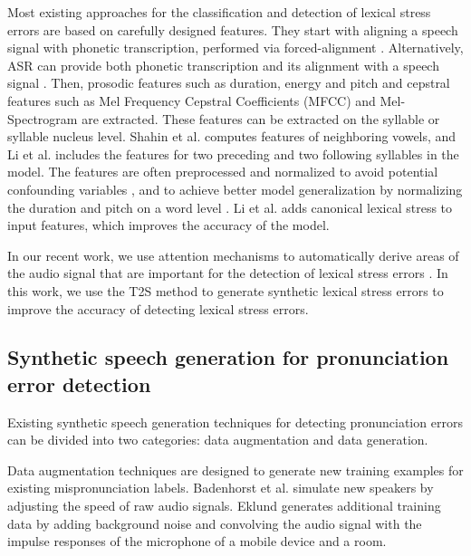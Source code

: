 \documentclass[]{interact}
\theoremstyle{plain}%
\theoremstyle{definition}
\theoremstyle{remark}
\begin{document}
Most existing approaches for the classification and detection of lexical stress errors are based on carefully designed features. They start with aligning a speech signal with phonetic transcription, performed via forced-alignment \cite{shahin2016automatic, chen2010automatic_2}. Alternatively, ASR can provide both phonetic transcription and its alignment with a speech signal \cite{li2013lexical}. Then, prosodic features such as duration, energy and pitch \cite{chen2010automatic_2} and cepstral features such as Mel Frequency Cepstral Coefficients (MFCC) and Mel-Spectrogram \cite{ferrer2015classification,shahin2016automatic} are extracted. These features can be extracted on the syllable \cite{shahin2016automatic} or syllable nucleus \cite{ferrer2015classification,chen2010automatic_2} level. Shahin et al. \cite{shahin2016automatic} computes features of neighboring vowels, and Li et al. \cite{li2013lexical} includes the features for two preceding and two following syllables in the model. The features are often preprocessed and normalized to avoid potential confounding variables \cite{ferrer2015classification}, and to achieve better model generalization by normalizing the duration and pitch on a word level \cite{ferrer2015classification,chen2007using}. Li et al. \cite{li2018automatic} adds canonical lexical stress to input features, which improves the accuracy of the model. 

In our recent work, we use attention mechanisms to automatically derive areas of the audio signal that are important for the detection of lexical stress errors  \cite{korzekwa21_interspeech}. In this work, we use the T2S method to generate synthetic lexical stress errors to improve the accuracy of detecting lexical stress errors.

\subsection{Synthetic speech generation for pronunciation error detection}

Existing synthetic speech generation techniques for detecting pronunciation errors can be divided into two categories: data augmentation and data generation.  

Data augmentation techniques are designed to generate new training examples for existing mispronunciation labels. Badenhorst et al. \cite{badenhorst2017limitations} simulate new speakers by adjusting the speed of raw audio signals. Eklund \cite {eklund2019data} generates additional training data by adding background noise and convolving the audio signal with the impulse responses of the microphone of a mobile device and a room.
\end{document}
